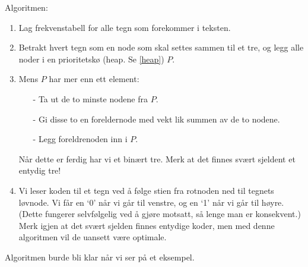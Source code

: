 		Algoritmen:
		\begin{enumerate}
			\item Lag frekvenstabell for alle tegn som forekommer i teksten.
			\item Betrakt hvert tegn som en node som skal settes sammen til et tre, og legg alle noder i en prioritetskø (heap. Se \ref{heap}) $P$.
			\item Mens $P$ har mer enn ett element:
				\begin{itemize}
					\item[-] Ta ut de to minste nodene fra $P$.	
					\item[-] Gi disse to en foreldernode med vekt lik summen av de to nodene.	
					\item[-] Legg foreldrenoden inn i $P$.	
				\end{itemize}
				Når dette er ferdig har vi et binært tre. Merk at det finnes svært sjeldent et entydig tre!
			\item Vi leser koden til et tegn ved å følge stien fra rotnoden ned til tegnets løvnode. Vi får en `0' når vi går til venstre, og en `1' når vi går til høyre. (Dette fungerer selvfølgelig ved å gjøre motsatt, så lenge man er konsekvent.) Merk igjen at det svært sjelden finnes entydige koder, men med denne algoritmen vil de uansett være optimale.
		\end{enumerate}
		Algoritmen burde bli klar når vi ser på et eksempel.

